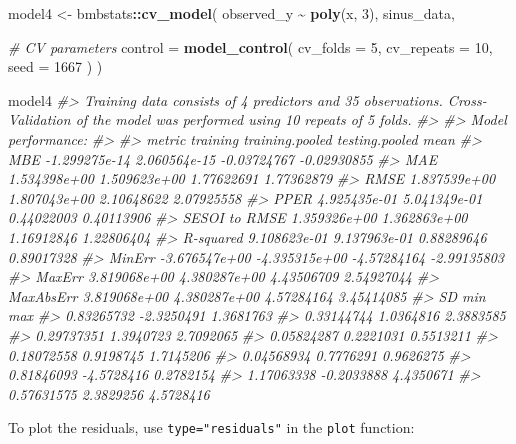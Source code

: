 \documentclass[
]{book}
\newenvironment{Shaded}{\begin{snugshade}}{\end{snugshade}}
\newcommand{\CommentTok}[1]{\textcolor[rgb]{0.56,0.35,0.01}{\textit{#1}}}
\newcommand{\DataTypeTok}[1]{\textcolor[rgb]{0.13,0.29,0.53}{#1}}
\newcommand{\DecValTok}[1]{\textcolor[rgb]{0.00,0.00,0.81}{#1}}
\newcommand{\KeywordTok}[1]{\textcolor[rgb]{0.13,0.29,0.53}{\textbf{#1}}}
\newcommand{\NormalTok}[1]{#1}
\newcommand{\OperatorTok}[1]{\textcolor[rgb]{0.81,0.36,0.00}{\textbf{#1}}}
\newcommand{\StringTok}[1]{\textcolor[rgb]{0.31,0.60,0.02}{#1}}
\begin{document}
\begin{Shaded}
\begin{Highlighting}[]
\NormalTok{model4 <{-}}\StringTok{ }\NormalTok{bmbstats}\OperatorTok{::}\KeywordTok{cv\_model}\NormalTok{(}
\NormalTok{  observed\_y }\OperatorTok{\textasciitilde{}}\StringTok{ }\KeywordTok{poly}\NormalTok{(x, }\DecValTok{3}\NormalTok{),}
\NormalTok{  sinus\_data,}

  \CommentTok{\# CV parameters}
  \DataTypeTok{control =} \KeywordTok{model\_control}\NormalTok{(}
    \DataTypeTok{cv\_folds =} \DecValTok{5}\NormalTok{,}
    \DataTypeTok{cv\_repeats =} \DecValTok{10}\NormalTok{,}
    \DataTypeTok{seed =} \DecValTok{1667}
\NormalTok{  )}
\NormalTok{)}

\NormalTok{model4}
\CommentTok{\#> Training data consists of 4 predictors and 35 observations. Cross{-}Validation of the model was performed using 10 repeats of 5 folds.}
\CommentTok{\#> }
\CommentTok{\#> Model performance:}
\CommentTok{\#> }
\CommentTok{\#>         metric      training training.pooled testing.pooled        mean}
\CommentTok{\#>            MBE {-}1.299275e{-}14    2.060564e{-}15    {-}0.03724767 {-}0.02930855}
\CommentTok{\#>            MAE  1.534398e+00    1.509623e+00     1.77622691  1.77362879}
\CommentTok{\#>           RMSE  1.837539e+00    1.807043e+00     2.10648622  2.07925558}
\CommentTok{\#>           PPER  4.925435e{-}01    5.041349e{-}01     0.44022003  0.40113906}
\CommentTok{\#>  SESOI to RMSE  1.359326e+00    1.362863e+00     1.16912846  1.22806404}
\CommentTok{\#>      R{-}squared  9.108623e{-}01    9.137963e{-}01     0.88289646  0.89017328}
\CommentTok{\#>         MinErr {-}3.676547e+00   {-}4.335315e+00    {-}4.57284164 {-}2.99135803}
\CommentTok{\#>         MaxErr  3.819068e+00    4.380287e+00     4.43506709  2.54927044}
\CommentTok{\#>      MaxAbsErr  3.819068e+00    4.380287e+00     4.57284164  3.45414085}
\CommentTok{\#>          SD        min       max}
\CommentTok{\#>  0.83265732 {-}2.3250491 1.3681763}
\CommentTok{\#>  0.33144744  1.0364816 2.3883585}
\CommentTok{\#>  0.29737351  1.3940723 2.7092065}
\CommentTok{\#>  0.05824287  0.2221031 0.5513211}
\CommentTok{\#>  0.18072558  0.9198745 1.7145206}
\CommentTok{\#>  0.04568934  0.7776291 0.9626275}
\CommentTok{\#>  0.81846093 {-}4.5728416 0.2782154}
\CommentTok{\#>  1.17063338 {-}0.2033888 4.4350671}
\CommentTok{\#>  0.57631575  2.3829256 4.5728416}
\end{Highlighting}
\end{Shaded}

To plot the residuals, use \texttt{type="residuals"} in the \texttt{plot} function:
\end{document}

